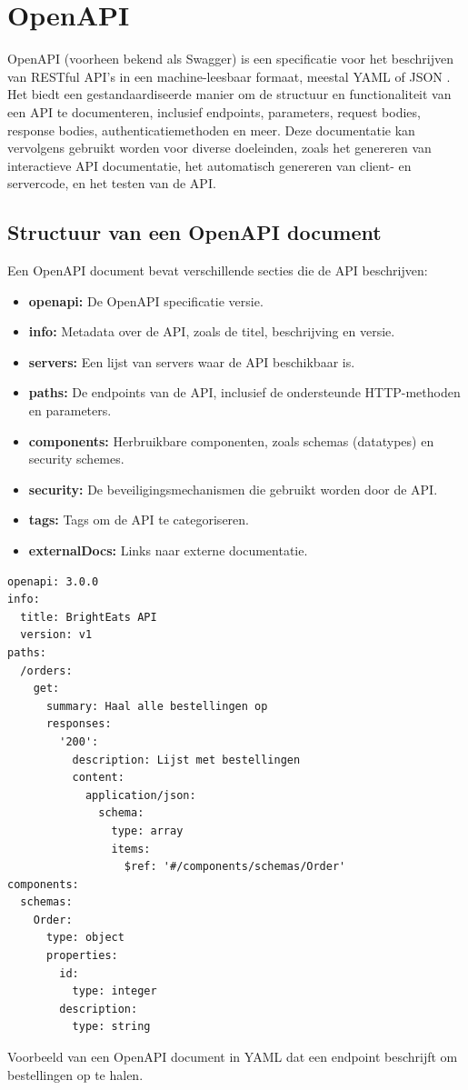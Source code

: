 \section{OpenAPI}

OpenAPI (voorheen bekend als Swagger) is een specificatie voor het beschrijven van RESTful API's in een machine-leesbaar formaat, meestal YAML of JSON \autocite{OpenAPIInitiative2021}. Het biedt een gestandaardiseerde manier om de structuur en functionaliteit van een API te documenteren, inclusief endpoints, parameters, request bodies, response bodies, authenticatiemethoden en meer. Deze documentatie kan vervolgens gebruikt worden voor diverse doeleinden, zoals het genereren van interactieve API documentatie, het automatisch genereren van client- en servercode, en het testen van de API.

\subsection{Structuur van een OpenAPI document}

Een OpenAPI document bevat verschillende secties die de API beschrijven:

\begin{itemize}
    \item \textbf{openapi:} De OpenAPI specificatie versie.
    \item \textbf{info:} Metadata over de API, zoals de titel, beschrijving en versie.
    \item \textbf{servers:} Een lijst van servers waar de API beschikbaar is.
    \item \textbf{paths:} De endpoints van de API, inclusief de ondersteunde HTTP-methoden en parameters.
    \item \textbf{components:} Herbruikbare componenten, zoals schemas (datatypes) en security schemes.
    \item \textbf{security:} De beveiligingsmechanismen die gebruikt worden door de API.
    \item \textbf{tags:} Tags om de API te categoriseren.
    \item \textbf{externalDocs:} Links naar externe documentatie.
\end{itemize}

\begin{listing}[H]
\begin{verbatim}
openapi: 3.0.0
info:
  title: BrightEats API
  version: v1
paths:
  /orders:
    get:
      summary: Haal alle bestellingen op
      responses:
        '200':
          description: Lijst met bestellingen
          content:
            application/json:
              schema:
                type: array
                items:
                  $ref: '#/components/schemas/Order'
components:
  schemas:
    Order:
      type: object
      properties:
        id:
          type: integer
        description:
          type: string
\end{verbatim}
\caption[Voorbeeld van een OpenAPI document in YAML]{Voorbeeld van een OpenAPI document in YAML dat een endpoint beschrijft om bestellingen op te halen.}
\label{lst:openapi_example}
\end{listing}


